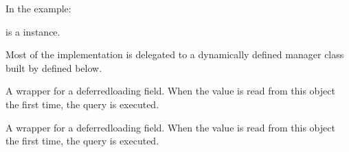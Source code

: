 \documentclass[a4paper,11pt,spanish]{sphinxmanual}
\begin{document}
\begin{fulllineitems}
\begin{fulllineitems}
\sphinxAtStartPar
In the example:

\begin{sphinxVerbatim}[commandchars=\\\{\}]
       
\end{sphinxVerbatim}

\sphinxAtStartPar
{} is a  instance.

\sphinxAtStartPar
Most of the implementation is delegated to a dynamically defined manager
class built by  defined below.

\end{fulllineitems}


\begin{fulllineitems}
\label{\detokenize{api/supplier/supplier.models:supplier.models.Supplier.name}}
\pysigstartsignatures
\pysigline
{}
\pysigstopsignatures
\sphinxAtStartPar
A wrapper for a deferred\sphinxhyphen{}loading field. When the value is read from this
object the first time, the query is executed.

\end{fulllineitems}


\begin{fulllineitems}
\label{\detokenize{api/supplier/supplier.models:supplier.models.Supplier.notes}}
\pysigstartsignatures
\pysigline
{}
\pysigstopsignatures
\sphinxAtStartPar
A wrapper for a deferred\sphinxhyphen{}loading field. When the value is read from this
object the first time, the query is executed.

\end{fulllineitems}



\end{fulllineitems}
\end{document}
